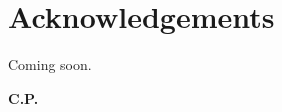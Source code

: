 \thispagestyle{empty}
\section*{Acknowledgements}
Coming soon.
\begin{flushright}
\textbf{C.P.} %
\end{flushright}


